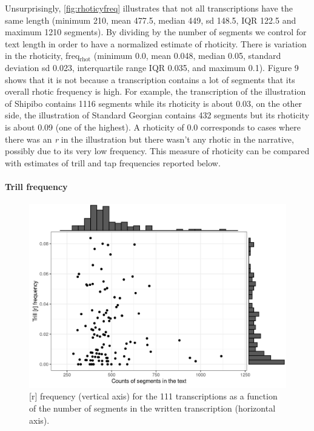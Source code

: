 Unsurprisingly, \autoref{fig:rhoticyfreq} illustrates that not all transcriptions have the same length (minimum 210, mean 477.5, median 449, sd 148.5, IQR 122.5 and maximum 1210 segments). By dividing by the number of segments we control for text length in order to have a normalized estimate of rhoticity. There is variation in the rhoticity, freq$_\textrm{rhot}$ (minimum 0.0, mean 0.048, median 0.05, standard deviation sd 0.023, interquartile range IQR 0.035, and maximum 0.1). Figure 9 shows that it is not because a transcription contains a lot of segments that its overall rhotic frequency is high. For example, the transcription of the illustration of Shipibo \parencite{valenzuelaShipibo2001} contains 1116 segments while its rhoticity is about 0.03, on the other side, the illustration of Standard Georgian \parencite{shostedStandardGeorgian2006} contains 432 segments but its rhoticity is about 0.09 (one of the highest). A rhoticity of 0.0 corresponds to cases where there was an \textit{r} in the illustration but there wasn’t any rhotic in the narrative, possibly due to its very low frequency. This measure of rhoticity can be compared with estimates of trill and tap frequencies reported below.

\paragraph{Trill frequency}

\begin{figure}
	\centering
	\includegraphics[width=0.75\linewidth]{jipa/images/trill_phonetic_freq}
	\caption[\textrm{[r]} frequency for the 111 transcriptions as a function of the number of segments in the written transcription]{[r] frequency (vertical axis) for the 111 transcriptions as a function of the number of segments in the written transcription (horizontal axis).}
	\label{fig:trillphoneticfreq}
\end{figure}

